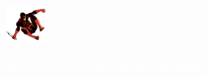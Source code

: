 \documentclass[12pt]{article}
\begin{document}
\newpage
{}

\begin{center}
    \vspace*{2cm}
    \includegraphics[width=0.1\textwidth]{daredevil1.png}
    \vspace{0.3cm}

    {\Huge \textbf{\textcolor{white}{Daredevil Chronological Checklist}}}
\end{center}
\end{document}
